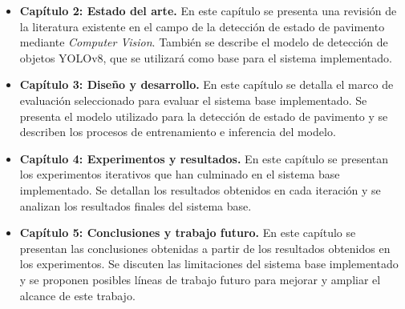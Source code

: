 \begin{itemize}
    \item \textbf{Capítulo 2: Estado del arte.} En este capítulo se presenta una revisión de la literatura existente en el campo de la detección de estado de pavimento mediante \textit{Computer Vision}. También se describe el modelo de detección de objetos YOLOv8, que se utilizará como base para el sistema implementado.
    
    \item \textbf{Capítulo 3: Diseño y desarrollo.} En este capítulo se detalla el marco de evaluación seleccionado para evaluar el sistema base implementado. Se presenta el modelo utilizado para la detección de estado de pavimento y se describen los procesos de entrenamiento e inferencia del modelo.
    
    \item \textbf{Capítulo 4: Experimentos y resultados.} En este capítulo se presentan los experimentos iterativos que han culminado en el sistema base implementado. Se detallan los resultados obtenidos en cada iteración y se analizan los resultados finales del sistema base.
    
    \item \textbf{Capítulo 5: Conclusiones y trabajo futuro.} En este capítulo se presentan las conclusiones obtenidas a partir de los resultados obtenidos en los experimentos. Se discuten las limitaciones del sistema base implementado y se proponen posibles líneas de trabajo futuro para mejorar y ampliar el alcance de este trabajo.
\end{itemize}
